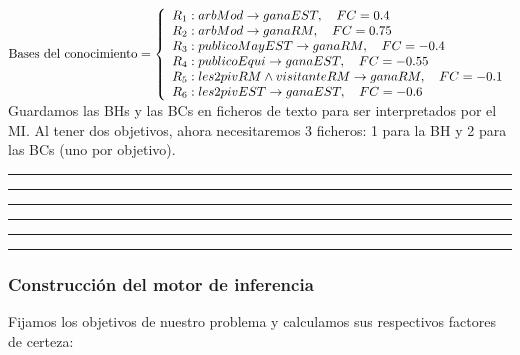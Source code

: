 \documentclass[a4paper,11pt, includehead]{article}
\begin{document}
\vspace{6ex}

\noindent$
\text{Bases del conocimiento} =
\left\{ 
\begin{array}{l}
	R_1: arbMod \rightarrow ganaEST, \quad FC = 0.4 \cr
	R_2: arbMod \rightarrow ganaRM, \quad FC = 0.75 \cr
	R_3: publicoMayEST \rightarrow ganaRM, \quad FC = -0.4 \cr
	R_4: publicoEqui \rightarrow ganaEST, \quad FC = -0.55 \cr
	R_5: les2pivRM \land visitanteRM \rightarrow ganaRM, \quad FC = -0.1 \cr
	R_6: les2pivEST \rightarrow ganaEST, \quad FC = -0.6
\end{array} 
\right.
$
\vspace{4ex}
\noindent Guardamos las BHs y las BCs en ficheros de texto para ser interpretados por el MI. Al tener dos objetivos, ahora necesitaremos 3 ficheros: 1 para la BH y 2 para las BCs (uno por objetivo).

\vspace{3ex}

\hrule

\hrule

\vspace{5ex}

\noindent
\begin{minipage}[t]{0.45\textwidth}
	\hrule
	
	\hrule
\end{minipage}%
\hspace{0.10\textwidth} %
\begin{minipage}[t]{0.45\textwidth}
	\hrule
	
	\hrule
\end{minipage}

\vspace{3ex}

\subsubsection{Construcción del motor de inferencia}
\noindent Fijamos los objetivos de nuestro problema y calculamos sus respectivos factores de certeza:
\end{document}
